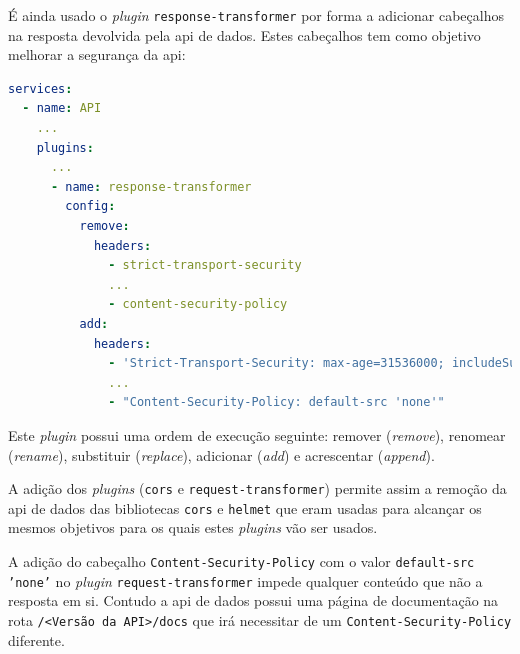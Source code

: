 É ainda usado o \textit{plugin} \texttt{response-transformer} por forma a adicionar cabeçalhos na resposta devolvida pela \acrshort{api} de dados. Estes cabeçalhos tem como objetivo melhorar a segurança da \acrshort{api}\cite{kongResponseTransformer}:
\begin{lstlisting}[language=yaml, caption=Configuração declarativa do \textit{Kong}: \textit{plugin} \texttt{response-transformer}]
services:
  - name: API
    ...
    plugins:
      ...
      - name: response-transformer
        config:
          remove:
            headers:
              - strict-transport-security
              ...
              - content-security-policy
          add:
            headers:
              - 'Strict-Transport-Security: max-age=31536000; includeSubDomains; preload'
              ...
              - "Content-Security-Policy: default-src 'none'"
\end{lstlisting}

Este \textit{plugin} possui uma ordem de execução seguinte: remover (\textit{remove}), renomear (\textit{rename}), substituir (\textit{replace}), adicionar (\textit{add}) e acrescentar (\textit{append}).

A adição dos \textit{plugins} (\texttt{cors} e \texttt{request-transformer}) permite assim a remoção da \acrshort{api} de dados das bibliotecas \texttt{cors} e \texttt{helmet} que eram usadas para alcançar os mesmos objetivos para os quais estes \textit{plugins} vão ser usados.

A adição do cabeçalho \texttt{Content-Security-Policy} com o valor \texttt{default-src 'none'} no \textit{plugin} \texttt{request-transformer} impede qualquer conteúdo que não a resposta em si. Contudo a \acrshort{api} de dados possui uma página de documentação na rota \texttt{/<Versão da API>/docs} que irá necessitar de um \texttt{Content-Security-Policy} diferente. 

